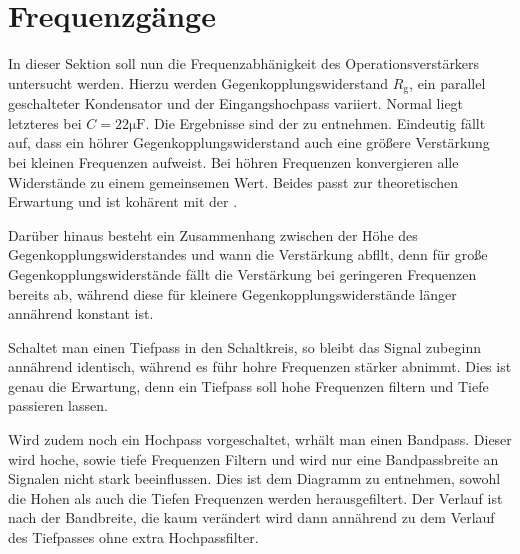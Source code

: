 \section{Frequenzgänge}
\label{sec:A2}
In dieser Sektion soll nun die Frequenzabhänigkeit des Operationsverstärkers untersucht werden. Hierzu werden Gegenkopplungswiderstand $R_\text{g}$, ein parallel geschalteter Kondensator und der Eingangshochpass variiert. Normal liegt letzteres bei $C = 22\mathrm{\mu F}$.
Die Ergebnisse sind der  zu entnehmen.
Eindeutig fällt auf, dass ein höhrer Gegenkopplungswiderstand auch eine größere Verstärkung bei kleinen Frequenzen aufweist. Bei höhren Frequenzen konvergieren alle Widerstände zu einem gemeinsemen Wert.
Beides passt zur theoretischen Erwartung und ist kohärent mit der .

Darüber hinaus besteht ein Zusammenhang zwischen der Höhe des Gegenkopplungswiderstandes und wann die Verstärkung abfllt, denn für große Gegenkopplungswiderstände fällt die Verstärkung bei geringeren Frequenzen bereits ab, während diese für kleinere Gegenkopplungswiderstände länger annährend konstant ist.

Schaltet man einen Tiefpass in den Schaltkreis, so bleibt das Signal zubeginn annährend identisch, während es führ hohre Frequenzen stärker abnimmt. Dies ist genau die Erwartung, denn ein Tiefpass soll hohe Frequenzen filtern und Tiefe passieren lassen. 

Wird zudem noch ein Hochpass vorgeschaltet, wrhält man einen Bandpass. Dieser wird hoche, sowie tiefe Frequenzen Filtern und wird nur eine Bandpassbreite an Signalen nicht stark beeinflussen. Dies ist dem Diagramm zu entnehmen, sowohl die Hohen als auch die Tiefen Frequenzen werden herausgefiltert. Der Verlauf ist nach der Bandbreite, die kaum verändert wird dann annährend zu dem Verlauf des Tiefpasses ohne extra Hochpassfilter.



